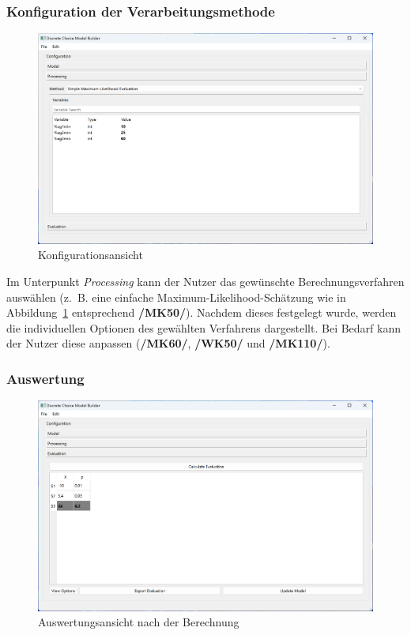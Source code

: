\documentclass{article}
\begin{document}
\subsubsection{Konfiguration der Verarbeitungsmethode}
\begin{figure}[H]%
  \centering
  \includegraphics[width=12cm]{specifications/img/gui-screenshots/processing.png}
  \caption{Konfigurationsansicht}
  \label{gui:fig_processing}
\end{figure}
Im Unterpunkt \emph{Processing} kann der Nutzer das gewünschte Berechnungsverfahren auswählen (z.~B. eine einfache Maximum-Likelihood-Schätzung wie in Abbildung~\ref{gui:fig_processing} entsprechend \textbf{/MK50/}). Nachdem dieses festgelegt wurde, werden die individuellen Optionen des gewählten Verfahrens dargestellt. Bei Bedarf kann der Nutzer diese anpassen (\textbf{/MK60/}, \textbf{/WK50/} und \textbf{/MK110/}).\\

\subsubsection{Auswertung}
\begin{figure}[H]%
  \centering
  \includegraphics[width=12cm]{specifications/img/gui-screenshots/evaluation.png}
  \caption{Auswertungsansicht nach der Berechnung}
  \label{gui:fig_evaluation}
\end{figure}
\end{document}
